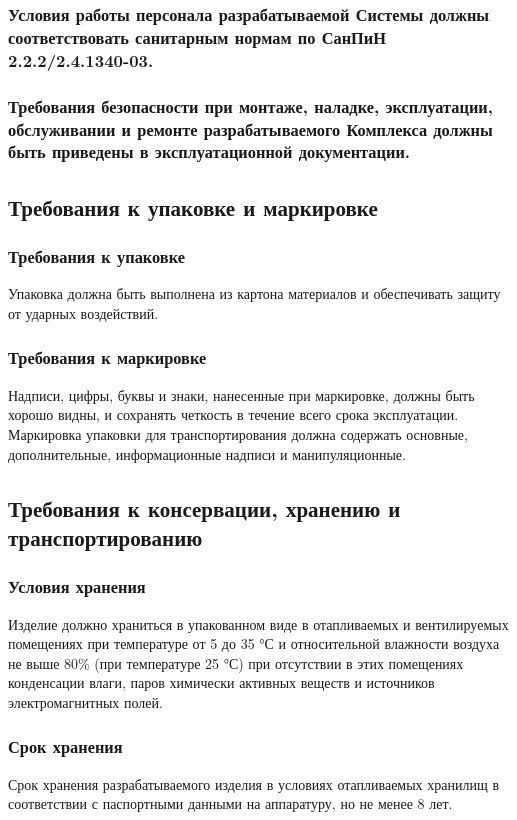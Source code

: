			\subsubsection{Условия работы персонала разрабатываемой Системы должны соответствовать санитарным нормам по СанПиН 2.2.2/2.4.1340-03.}
			\subsubsection{Требования безопасности при монтаже, наладке, эксплуатации, обслуживании и ремонте разрабатываемого Комплекса должны быть приведены в эксплуатационной документации.}
		\subsection{Требования к упаковке и маркировке}
			\subsubsection{Требования к упаковке}
				Упаковка должна быть выполнена из картона материалов и обеспечивать защиту от ударных воздействий.
			\subsubsection{Требования к маркировке}
				Надписи, цифры, буквы и знаки, нанесенные при маркировке, должны быть хорошо видны, и сохранять четкость в течение всего срока эксплуатации.
				Маркировка упаковки для транспортирования должна содержать основные, дополнительные, информационные надписи и манипуляционные.
		\subsection{Требования к консервации, хранению и транспортированию}
			\subsubsection{Условия хранения}
				Изделие должно храниться в упакованном виде в отапливаемых и вентилируемых помещениях при температуре от 5 до 35 °С и относительной влажности воздуха не выше 80\% (при температуре 25 °С) при отсутствии в этих помещениях конденсации влаги, паров химически активных веществ и источников электромагнитных полей.
			\subsubsection{Срок хранения}
				Срок хранения разрабатываемого изделия в условиях отапливаемых хранилищ в соответствии с паспортными данными на аппаратуру, но не менее 8 лет.

